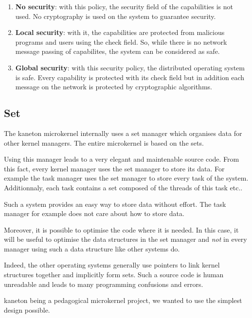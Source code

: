\begin{multicols}{2}
\begin{enumerate}
  \item
    \textbf{No security}: with this policy, the security field of the
    capabilities is not used. No cryptography is used on the system
    to guarantee security.
  \item
    \textbf{Local security}: with it, the capabilities are protected from
    malicious programs and users using the check field. So, while there
    is no network message passing of capabilites, the system can be
    considered as safe.
  \item
    \textbf{Global security}: with this security policy, the distributed
    operating system is safe. Every capability is protected with its check
    field but in addition each message on the network is protected by
    cryptographic algorithms.
\end{enumerate}

%
%

\subsection{Set}

The kaneton microkernel internally uses a set manager which organises data
for other kernel managers. The entire microkernel is based on the sets.

Using this manager leads to a very elegant and maintenable source code. From
this fact, every kernel manager uses the set manager to store its data. For
example the task manager uses the set manager to store every task of the
system. Additionnaly, each task contains a set composed of the threads of
this task etc..

Such a system provides an easy way to store data without effort. The task
manager for example does not care about how to store data.

Moreover, it is possible to optimise the code where it is needed. In this
case, it will be useful to optimise the data structures in the set manager
and \textit{not} in every manager using such a data structure like
other systems do.

Indeed, the other operating systems generally use pointers to link kernel
structures together and implicitly form sets. Such a source code is human
unreadable and leads to many programming confusions and errors.

kaneton being a pedagogical microkernel project, we wanted to use the simplest
design possible.


\end{multicols}
